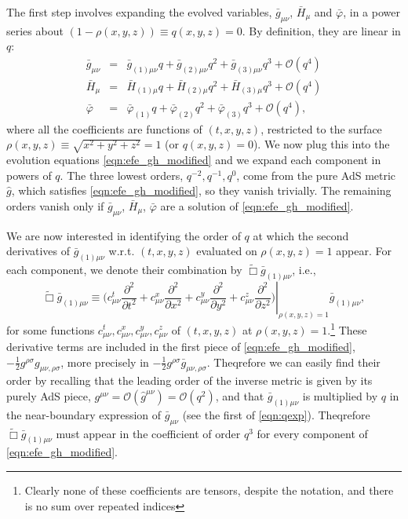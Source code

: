 \documentclass[a4paper,11pt]{article}
\numberwithin{equation}{section}
\begin{document}
The first step involves expanding the evolved variables, $\bar{g}_{\mu \nu}$, $\bar{H}_{\mu}$ and $\bar{\varphi}$, in a power series about $(1-\rho(x,y,z)) \equiv q(x,y,z) = 0$. By definition, they are linear in $q$:
\begin{eqnarray}\label{eqn:qexp}
\bar{g}_{\mu \nu} &=& \bar{g}_{(1) \mu \nu} q + \bar{g}_{(2) \mu \nu} q^2 + \bar{g}_{(3) \mu \nu} q^3 + \mathcal{O}(q^4) \nonumber \\
\bar{H}_{\mu} &=& \bar{H}_{(1) \mu} q + \bar{H}_{(2) \mu} q^2 + \bar{H}_{(3) \mu} q^3 + \mathcal{O}(q^4) \nonumber \\
\bar{\varphi} &=& \bar{\varphi}_{(1)} q + \bar{\varphi}_{(2)} q^2 + \bar{\varphi}_{(3)} q^3 + \mathcal{O}(q^4),
\end{eqnarray}
where all the coefficients are functions of $(t,x,y,z)$, restricted to the surface $\rho(x,y,z)\equiv\sqrt{x^2+y^2+z^2}=1$ (or $q(x,y,z)=0$). We now plug this into the evolution equations \eqref{eqn:efe_gh_modified} and we expand each component in powers of $q$. The three lowest orders, $q^{-2},q^{-1},q^0$, come from the pure AdS metric $\hat{g}$, which satisfies \eqref{eqn:efe_gh_modified}, so they vanish trivially. The remaining orders vanish only if $\bar{g}_{\mu \nu}$, $\bar{H}_{\mu}$, $\bar{\varphi}$ are a solution of \eqref{eqn:efe_gh_modified}.

We are now interested in identifying the order of $q$ at which the second derivatives of $ \bar{g}_{(1) \mu \nu}$ w.r.t. $(t,x,y,z)$ evaluated on $\rho(x,y,z)=1$ appear.
For each component, we denote their combination by $\tilde{\Box}\bar{g}_{(1)\mu\nu}$, i.e., 
\begin{equation}
\tilde{\Box}\bar{g}_{(1)\mu\nu}\equiv\left.\biggl(c^t_{\mu\nu}\frac{\partial^2}{\partial t^2}+c^x_{\mu\nu}\frac{\partial^2}{\partial x^2}+c^y_{\mu\nu}\frac{\partial^2}{\partial y^2}+c^z_{\mu\nu}\frac{\partial^2}{\partial z^2}\biggr)\right |_{\rho(x,y,z)=1}\bar{g}_{(1)\mu\nu},
\end{equation}
for some functions $c^t_{\mu\nu},c^x_{\mu\nu},c^y_{\mu\nu},c^z_{\mu\nu}$ of $(t,x,y,z)$ at $\rho(x,y,z)=1$.\footnote{Clearly none of these coefficients are tensors, despite the notation, and there is no sum over repeated indices}
These derivative terms are included in the first piece of \eqref{eqn:efe_gh_modified}, $-\frac{1}{2}g^{\rho \sigma} g_{\mu \nu, \rho \sigma}$, more precisely in $-\frac{1}{2}g^{\rho \sigma} \bar{g}_{\mu \nu, \rho \sigma}$.
Theqrefore we can easily find their order by recalling that the leading order of the inverse metric is given by its purely AdS piece, $g^{\mu\nu}=\mathcal{O}(\hat{g}^{\mu\nu})=\mathcal{O}(q^{2})$, and that $\bar{g}_{(1)\mu\nu}$ is multiplied by $q$ in the near-boundary expression of $\bar{g}_{\mu\nu}$ (see the first of \eqref{eqn:qexp}). Theqrefore $\tilde{\Box}\bar{g}_{(1)\mu\nu}$ must appear in the coefficient of order $q^{3}$ for every component of \eqref{eqn:efe_gh_modified}.
\end{document}
